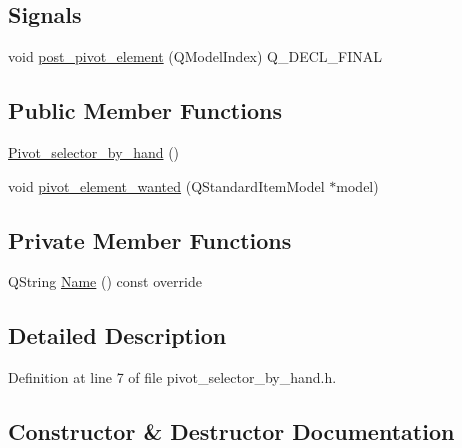 \subsection*{Signals}
\begin{DoxyCompactItemize}
\item 
void \hyperlink{classPivot__selector__by__hand_a4ea3619df38bf9d93fc0d263d4b12cdc}{post\+\_\+pivot\+\_\+element} (Q\+Model\+Index) Q\+\_\+\+D\+E\+C\+L\+\_\+\+F\+I\+N\+AL
\end{DoxyCompactItemize}
\subsection*{Public Member Functions}
\begin{DoxyCompactItemize}
\item 
\hyperlink{classPivot__selector__by__hand_a3bdb79fdbf28b8066b60e51ad9367ab7}{Pivot\+\_\+selector\+\_\+by\+\_\+hand} ()
\item 
void \hyperlink{classPivot__selector__by__hand_adbb9dac36bf6cc6807433c617c19ad32}{pivot\+\_\+element\+\_\+wanted} (Q\+Standard\+Item\+Model $\ast$model)
\end{DoxyCompactItemize}
\subsection*{Private Member Functions}
\begin{DoxyCompactItemize}
\item 
Q\+String \hyperlink{classPivot__selector__by__hand_adb03a4ea722819c478e5fd71e5e6f364}{Name} () const override
\end{DoxyCompactItemize}


\subsection{Detailed Description}


Definition at line 7 of file pivot\+\_\+selector\+\_\+by\+\_\+hand.\+h.



\subsection{Constructor \& Destructor Documentation}
\mbox{\label{classPivot__selector__by__hand_a3bdb79fdbf28b8066b60e51ad9367ab7}} 
